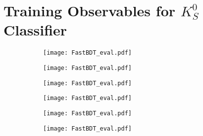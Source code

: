 \chapter{Training Observables for $K_S^0$ Classifier}

\begin{figure}[H]
	\caption{The distribution of Ks training variables. The red is the from fake $K_S^0$ and the blue is from true $K_S^0$}
\begin{subfigure}{0.5\linewidth}
	\texttt{[image: FastBDT\_eval.pdf]}
\end{subfigure}
\begin{subfigure}{0.5\linewidth}
		\texttt{[image: FastBDT\_eval.pdf]}
\end{subfigure}
\begin{subfigure}{0.5\linewidth}
		\texttt{[image: FastBDT\_eval.pdf]}
\end{subfigure}
\begin{subfigure}{0.5\linewidth}
		\texttt{[image: FastBDT\_eval.pdf]}
\end{subfigure}
\begin{subfigure}{0.5\linewidth}
		\texttt{[image: FastBDT\_eval.pdf]}
\end{subfigure}
\begin{subfigure}{0.5\linewidth}
	\texttt{[image: FastBDT\_eval.pdf]}
\end{subfigure}
\end{figure}

